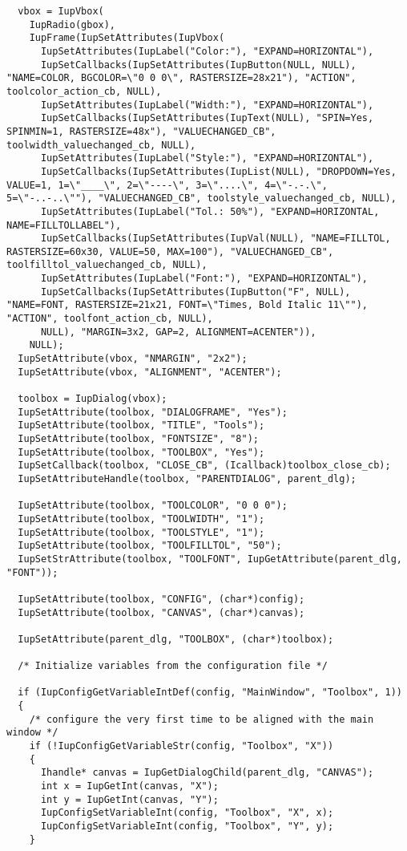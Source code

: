 \documentclass{ctexart}
\begin{document}
\begin{lstlisting}
  vbox = IupVbox(
    IupRadio(gbox),
    IupFrame(IupSetAttributes(IupVbox(
      IupSetAttributes(IupLabel("Color:"), "EXPAND=HORIZONTAL"),
      IupSetCallbacks(IupSetAttributes(IupButton(NULL, NULL), "NAME=COLOR, BGCOLOR=\"0 0 0\", RASTERSIZE=28x21"), "ACTION", toolcolor_action_cb, NULL),
      IupSetAttributes(IupLabel("Width:"), "EXPAND=HORIZONTAL"),
      IupSetCallbacks(IupSetAttributes(IupText(NULL), "SPIN=Yes, SPINMIN=1, RASTERSIZE=48x"), "VALUECHANGED_CB", toolwidth_valuechanged_cb, NULL),
      IupSetAttributes(IupLabel("Style:"), "EXPAND=HORIZONTAL"),
      IupSetCallbacks(IupSetAttributes(IupList(NULL), "DROPDOWN=Yes, VALUE=1, 1=\"____\", 2=\"----\", 3=\"....\", 4=\"-.-.\", 5=\"-..-..\""), "VALUECHANGED_CB", toolstyle_valuechanged_cb, NULL),
      IupSetAttributes(IupLabel("Tol.: 50%"), "EXPAND=HORIZONTAL, NAME=FILLTOLLABEL"),
      IupSetCallbacks(IupSetAttributes(IupVal(NULL), "NAME=FILLTOL, RASTERSIZE=60x30, VALUE=50, MAX=100"), "VALUECHANGED_CB", toolfilltol_valuechanged_cb, NULL),
      IupSetAttributes(IupLabel("Font:"), "EXPAND=HORIZONTAL"),
      IupSetCallbacks(IupSetAttributes(IupButton("F", NULL), "NAME=FONT, RASTERSIZE=21x21, FONT=\"Times, Bold Italic 11\""), "ACTION", toolfont_action_cb, NULL),
      NULL), "MARGIN=3x2, GAP=2, ALIGNMENT=ACENTER")),
    NULL);
  IupSetAttribute(vbox, "NMARGIN", "2x2");
  IupSetAttribute(vbox, "ALIGNMENT", "ACENTER");

  toolbox = IupDialog(vbox);
  IupSetAttribute(toolbox, "DIALOGFRAME", "Yes");
  IupSetAttribute(toolbox, "TITLE", "Tools");
  IupSetAttribute(toolbox, "FONTSIZE", "8");
  IupSetAttribute(toolbox, "TOOLBOX", "Yes");
  IupSetCallback(toolbox, "CLOSE_CB", (Icallback)toolbox_close_cb);
  IupSetAttributeHandle(toolbox, "PARENTDIALOG", parent_dlg);

  IupSetAttribute(toolbox, "TOOLCOLOR", "0 0 0");
  IupSetAttribute(toolbox, "TOOLWIDTH", "1");
  IupSetAttribute(toolbox, "TOOLSTYLE", "1");
  IupSetAttribute(toolbox, "TOOLFILLTOL", "50");
  IupSetStrAttribute(toolbox, "TOOLFONT", IupGetAttribute(parent_dlg, "FONT"));

  IupSetAttribute(toolbox, "CONFIG", (char*)config);
  IupSetAttribute(toolbox, "CANVAS", (char*)canvas);

  IupSetAttribute(parent_dlg, "TOOLBOX", (char*)toolbox);

  /* Initialize variables from the configuration file */

  if (IupConfigGetVariableIntDef(config, "MainWindow", "Toolbox", 1))
  {
    /* configure the very first time to be aligned with the main window */
    if (!IupConfigGetVariableStr(config, "Toolbox", "X"))
    {
      Ihandle* canvas = IupGetDialogChild(parent_dlg, "CANVAS");
      int x = IupGetInt(canvas, "X");
      int y = IupGetInt(canvas, "Y");
      IupConfigSetVariableInt(config, "Toolbox", "X", x);
      IupConfigSetVariableInt(config, "Toolbox", "Y", y);
    }


\end{lstlisting}
\end{document}
